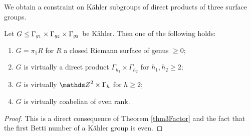 We obtain a constraint on K\"ahler subgroups of direct products of three surface groups.

\begin{corollary}
 Let $G\leq \Gamma_{g_1}\times \Gamma_{g_2}\times \Gamma_{g_3}$ be K\"ahler. Then one of the following holds:
 \begin{enumerate}
  \item $G=\pi_1 R$ for $R$ a closed Riemann surface of genus $\geq 0$;
  \item $G$ is virtually a direct product $\Gamma_{h_1}\times \Gamma_{h_2}$ for $h_1, h_2\geq 2$;
  \item $G$ is virtually $\ZZ^2 \times \Gamma_h$ for $h\geq 2$;
  \item $G$ is virtually coabelian of even rank.
 \end{enumerate}
 \label{cor3Factor}
\end{corollary}

\begin{proof}
This is a direct consequence of Theorem \ref{thm3Factor} and the fact that the first Betti number of a K\"ahler group is even.
\end{proof}




